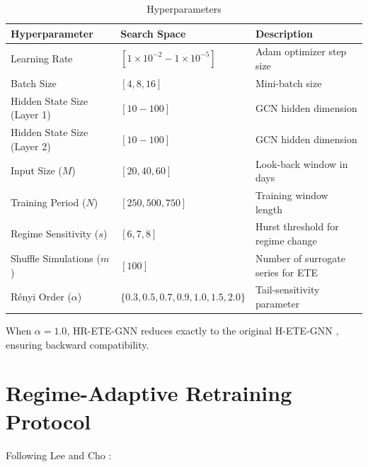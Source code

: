 \documentclass[12pt,oneside]{report}
\begin{document}
\begin{table}[htbp]
  \centering
  \singlespacing
  \caption{Hyperparameters}\label{tab:hyperparams}
  \small
  \begin{tabular}{lll}
    \toprule
    \textbf{Hyperparameter} & \textbf{Search Space} & \textbf{Description} \\
    \midrule
    Learning Rate               & $[1 \times 10^{-2} - 1 \times 10^{-5}]$ & Adam optimizer step size \\
    Batch Size                  & $[4, 8, 16]$                        & Mini-batch size \\
    Hidden State Size (Layer 1) & $[10 - 100]$                        & GCN hidden dimension \\
    Hidden State Size (Layer 2) & $[10 - 100]$                        & GCN hidden dimension \\
    Input Size ($M$)            & $[20, 40, 60]$                      & Look-back window in days \\
    Training Period ($N$)       & $[250, 500, 750]$                   & Training window length \\
    Regime Sensitivity ($s$)    & $[6, 7, 8]$                         & Hurst threshold for regime change \\
    Shuffle Simulations ($m$)   & $[100]$                             & Number of surrogate series for ETE \\
    Rényi Order ($\alpha$)      & $\{0.3, 0.5, 0.7, 0.9, 1.0, 1.5, 2.0\}$ & Tail-sensitivity parameter \\
    \bottomrule
  \end{tabular}
\end{table}

When $\alpha = 1.0$, HR-ETE-GNN reduces exactly to the original
H-ETE-GNN \cite{lee2025}, ensuring backward compatibility.

\section{Regime-Adaptive Retraining Protocol}

Following Lee and Cho \cite{lee2025}:
\end{document}
